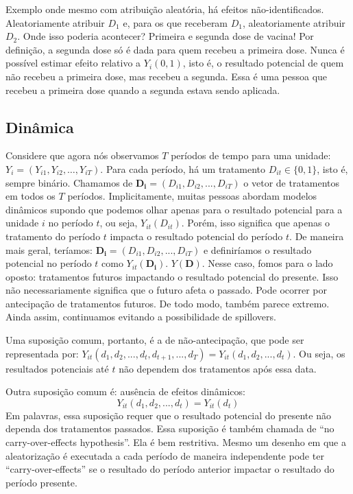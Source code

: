 \documentclass[
]{article}
\begin{document}
Exemplo onde mesmo com atribuição aleatória, há efeitos não-identificados. Aleatoriamente atribuir \(D_1\) e, para os que receberam \(D_1\), aleatoriamente atribuir \(D_2\). Onde isso poderia acontecer? Primeira e segunda dose de vacina! Por definição, a segunda dose só é dada para quem recebeu a primeira dose. Nunca é possível estimar efeito relativo a \(Y_i(0,1)\), isto é, o resultado potencial de quem não recebeu a primeira dose, mas recebeu a segunda. Essa é uma pessoa que recebeu a primeira dose quando a segunda estava sendo aplicada.

\subsection{Dinâmica}\label{dinuxe2mica}

Considere que agora nós observamos \(T\) períodos de tempo para uma unidade: \(Y_i = (Y_{i1}, Y_{i2}, \ldots, Y_{iT})\). Para cada período, há um tratamento \(D_{it} \in \{0,1\}\), isto é, sempre binário. Chamamos de \(\mathbf{D_i} = (D_{i1}, D_{i2}, ..., D_{iT})\) o vetor de tratamentos em todos os \(T\) períodos. Implicitamente, muitas pessoas abordam modelos dinâmicos supondo que podemos olhar apenas para o resultado potencial para a unidade \(i\) no período \(t\), ou seja, \(Y_{it}(D_{it})\). Porém, isso significa que apenas o tratamento do período \(t\) impacta o resultado potencial do período \(t\). De maneira mais geral, teríamos: \(\mathbf{D_i} = (D_{i1}, D_{i2}, ..., D_{iT})\) e definiríamos o resultado potencial no período \(t\) como \(Y_{it}(\mathbf{D_i})\). \(Y(\mathbf{D})\). Nesse caso, fomos para o lado oposto: tratamentos futuros impactando o resultado potencial do presente. Isso não necessariamente significa que o futuro afeta o passado. Pode ocorrer por antecipação de tratamentos futuros. De todo modo, também parece extremo. Ainda assim, continuamos evitando a possibilidade de spillovers.

Uma suposição comum, portanto, é a de não-antecipação, que pode ser representada por: \(Y_{it}(d_1, d_2, ..., d_t, d_{t+1}, ..., d_T) = Y_{it}(d_1, d_2, ..., d_t)\). Ou seja, os resultados potenciais até \(t\) não dependem dos tratamentos após essa data.

Outra suposição comum é: ausência de efeitos dinâmicos:
\[Y_{it}(d_1, d_2, ..., d_t) = Y_{it}(d_t)\]
Em palavras, essa suposição requer que o resultado potencial do presente não dependa dos tratamentos passados. Essa suposição é também chamada de ``no carry-over-effects hypothesis''. Ela é bem restritiva. Mesmo um desenho em que a aleatorização é executada a cada período de maneira independente pode ter ``carry-over-effects'' se o resultado do período anterior impactar o resultado do período presente.
\end{document}

